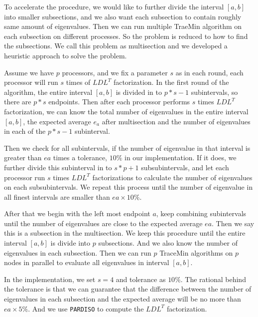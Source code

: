 To accelerate the procedure, we would like to further divide the interval $[a,b]$ into smaller subsections, and we also want each subsection to contain roughly same amount of eigenvalues. Then we can run multiple TraeMin algorithm on each subsection on different processes. So the problem is reduced to how to find the subsections. We call this problem as multisection and we developed a heuristic approach to solve the problem.

Assume we have $p$ processors, and we fix a parameter $s$ as in each round, each processor will run $s$ times of $LDL^T$ factorization. In the first round of the algorithm, the entire interval $[a, b]$ is divided in to $p*s - 1$ subintervals, so there are $p*s$ endpoints. Then after each processor performs $s$ times $LDL^T$ factorization, we can know the total number of eigenvalues in the entire interval $[a,b]$, the expected average $e_a$ after multisection and the number of eigenvalues in each of the $p*s-1$ subinterval.

Then we check for all subintervals, if the number of eigenvalue in that interval is greater than $ea$ times a tolerance, $10\%$ in our implementation. If it does, we further divide this subinterval in to $s*p+1$ subsubintervals, and let each processor run $s$ times $LDL^T$ factorizations to calculate the number of eigenvalues on each subsubintervals. We repeat this process until the number of eigenvalue in all finest intervals are smaller than $ea \times 10\%$. 

After that we begin with the left most endpoint $a$, keep combining subintervals until the number of eigenvalues are close to the expected average $ea$. Then we say this is a subsection in the multisection. We keep this procedure until the entire interval $[a,b]$ is divide into $p$ subsections. And we also know the number of eigenvalues in each subsection. Then we can run $p$ TraceMin algorithms on $p$ nodes in parallel to evaluate all eigenvalues in interval $[a,b]$.

In the implementation, we set $s = 4$ and tolerance as $10\%$. The rational behind the tolerance is that we can guarantee that the difference between the number of eigenvalues in each subsection and the expected average will be no more than $ea \times 5\%$. And we use {\tt PARDISO} to compute the $LDL^T$ factorization.



